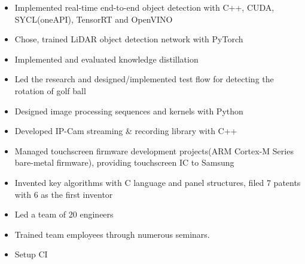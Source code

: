 \documentclass[10pt,a4paper,ragged2e,withhyper]{altacv}
\begin{document}
\begin{paracol}{2}

  \begin{itemize}
    \item Implemented real-time end-to-end object detection with C++, CUDA, SYCL(oneAPI), TensorRT and OpenVINO
    \item Chose, trained LiDAR object detection network with PyTorch
    \item Implemented and evaluated knowledge distillation
  \end{itemize}

  \divider

  \begin{itemize}
    \item Led the research and designed/implemented test flow for detecting the rotation of golf ball
    \item Designed image processing sequences and kernels with Python
    \item Developed IP-Cam streaming \& recording library with C++
  \end{itemize}

  \divider

  \begin{itemize}
    \item Managed touchscreen firmware development projects(ARM Cortex-M Series bare-metal firmware), providing touchscreen IC to Samsung
    \item Invented key algorithms with C language and panel structures, filed 7 patents with 6 as the first inventor
    \item Led a team of 20 engineers
    \item Trained team employees through numerous seminars.
    \item Setup CI
  \end{itemize}

\medskip



\end{paracol}
\end{document}

